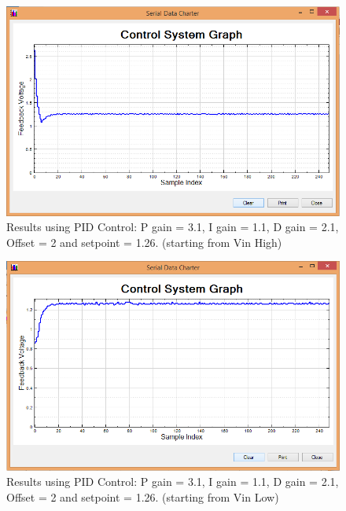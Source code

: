\documentclass[11pt]{article}
\begin{document}
	\begin{figure}[H]\centering
	\includegraphics[height=0.7\textwidth]{images/P3-1I1-1D1-2H1-26O2.png}
	\caption{Results using PID Control: P gain = 3.1, I gain = 1.1, D gain = 2.1, Offset = 2 and setpoint = 1.26. (starting from Vin High)}
		\label{PID}
	\end{figure}

	\begin{figure}[H]\centering
	\includegraphics[height=0.7\textwidth]{images/P3-1I1-1D1-2L1-26O2.png}
	\caption{Results using PID Control: P gain = 3.1, I gain = 1.1, D gain = 2.1, Offset = 2 and setpoint = 1.26. (starting from Vin Low)}
		\label{PID2}
	\end{figure}

\end{document}
